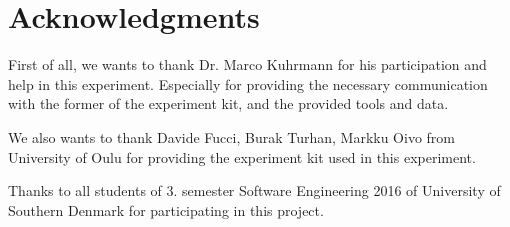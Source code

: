 \documentclass{sig-alternate-05-2015}
\begin{document}
\section{Acknowledgments}

First of all, we wants to thank Dr. Marco Kuhrmann for his participation and help in this experiment. Especially for providing the necessary communication with the former of the experiment kit, and the provided tools and data.

We also wants to thank Davide Fucci, Burak Turhan, Markku Oivo from University of Oulu for providing the experiment kit used in this experiment.

Thanks to all students of 3. semester Software Engineering 2016 of University of Southern Denmark for participating in this project.
\end{document}
